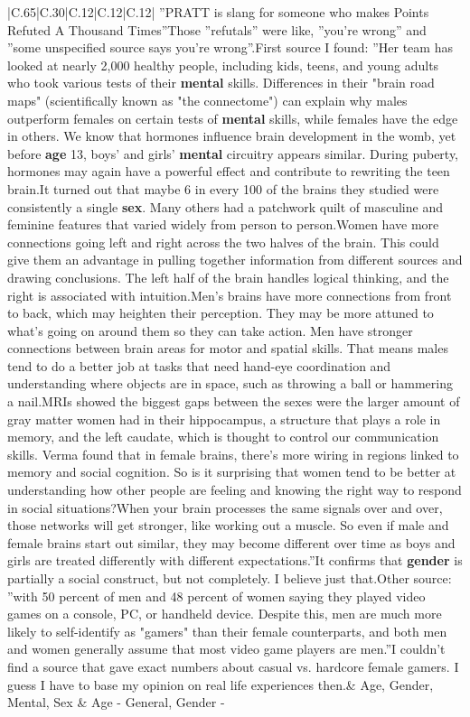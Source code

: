 \documentclass[11pt]{article}
\newlength\mylength
\begin{document}
\begin{center}
\begin{longtable}{|C{.65\mylength}|C{.30\mylength}|C{.12\mylength}|C{.12\mylength}|C{.12\mylength}|}
  \small ''PRATT is slang for someone who makes Points Refuted A Thousand Times''Those ''refutals'' were like, ''you're wrong'' and ''some unspecified source says you're wrong''.First source I found: ''Her team has looked at nearly 2,000 healthy people, including kids, teens, and young adults who took various tests of their \textbf{mental} skills. Differences in their "brain road maps" (scientifically known as "the connectome") can explain why males outperform females on certain tests of \textbf{mental} skills, while females have the edge in others. We know that hormones influence brain development in the womb, yet before \textbf{age} 13, boys' and girls' \textbf{mental} circuitry appears similar. During puberty, hormones may again have a powerful effect and contribute to rewriting the teen brain.It turned out that maybe 6 in every 100 of the brains they studied were consistently a single \textbf{sex}. Many others had a patchwork quilt of masculine and feminine features that varied widely from person to person.Women have more connections going left and right across the two halves of the brain. This could give them an advantage in pulling together information from different sources and drawing conclusions. The left half of the brain handles logical thinking, and the right is associated with intuition.Men's brains have more connections from front to back, which may heighten their perception. They may be more attuned to what's going on around them so they can take action. Men have stronger connections between brain areas for motor and spatial skills. That means males tend to do a better job at tasks that need hand-eye coordination and understanding where objects are in space, such as throwing a ball or hammering a nail.MRIs showed the biggest gaps between the sexes were the larger amount of gray matter women had in their hippocampus, a structure that plays a role in memory, and the left caudate, which is thought to control our communication skills. Verma found that in female brains, there's more wiring in regions linked to memory and social cognition. So is it surprising that women tend to be better at understanding how other people are feeling and knowing the right way to respond in social situations?When your brain processes the same signals over and over, those networks will get stronger, like working out a muscle. So even if male and female brains start out similar, they may become different over time as boys and girls are treated differently with different expectations.''It confirms that \textbf{gender} is partially a social construct, but not completely. I believe just that.Other source: ''with 50 percent of men and 48 percent of women saying they played video games on a console, PC, or handheld device. Despite this, men are much more likely to self-identify as "gamers" than their female counterparts, and both men and women generally assume that most video game players are men.''I couldn't find a source that gave exact numbers about casual vs. hardcore female gamers. I guess I have to base my opinion on real life experiences then.\normalsize   & Age, Gender, Mental, Sex & Age - General, Gender - 
\end{longtable}
\end{center}
\end{document}
